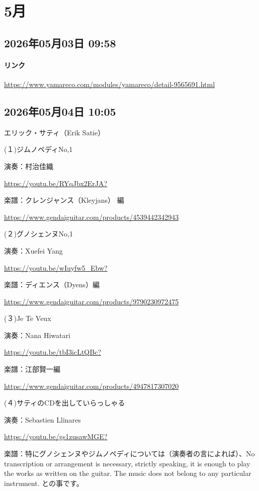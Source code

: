 \section{5月}

\subsection*{2026年05月03日 09:58}

\paragraph{リンク}
\url{https://www.yamareco.com/modules/yamareco/detail-9565691.html}

\subsection*{2026年05月04日 10:05}

エリック・サティ（Erik Satie）

(１)ジムノペディNo,1

演奏：村治佳織

\url{https://youtu.be/RYqJbx2ErJA?}

楽譜：クレンジャンス（Kleyjans） 編

\url{https://www.gendaiguitar.com/products/4539442342943}

(２)グノシェンヌNo,1

演奏：Xuefei Yang

\url{https://youtu.be/wIuyfw5_Ebw?}

楽譜：ディエンス（Dyens）編

\url{https://www.gendaiguitar.com/products/9790230972475}

(３)Je Te Veux

演奏：Nana Hiwatari

\url{https://youtu.be/tbI3icLtQBc?}

楽譜：江部賢一編

\url{https://www.gendaiguitar.com/products/4947817307020}

(４)サティのCDを出していらっしゃる

演奏：Sebastien Llinares

\url{https://youtu.be/gs1zusawMGE?}

楽譜：特にグノシェンヌやジムノペディについては（演奏者の言によれば）、No transcription or arrangement is necessary, strictly speaking, it is enough to play the works as written on the guitar. The music does not belong to any particular instrument. との事です。

